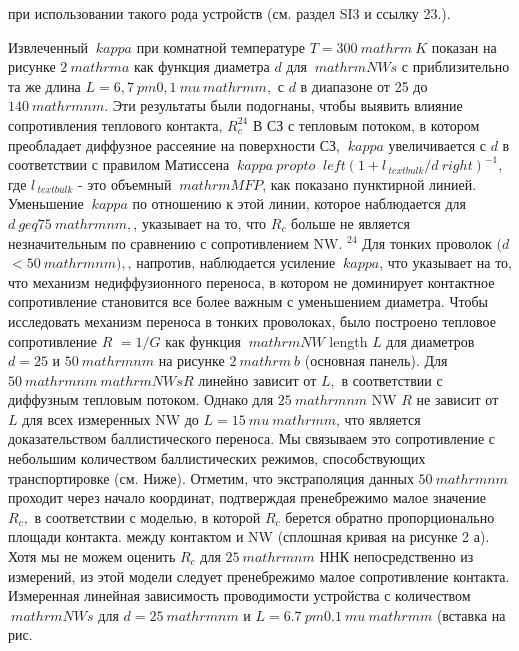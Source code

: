 \documentclass[a4paper, 12pt]{article}%
\begin{document}
при использовании такого рода устройств (см. раздел SI3 и ссылку 23.).

Извлеченный $ \ kappa $ при комнатной температуре $ T = 300 \ mathrm {~ K} $ показан на рисунке $ 2 \ mathrm {a} $ как функция диаметра $ d $ для $ \ mathrm {NWs} $ с приблизительно та же длина $ L = 6,7 \ pm 0,1 \ mu \ mathrm {m}, $ с $ d $ в диапазоне от 25 до $ 140 \ mathrm {nm}. $ Эти результаты были подогнаны, чтобы выявить влияние сопротивления теплового контакта, $ R_ {c} ^ {24} $ В СЗ с тепловым потоком, в котором преобладает диффузное рассеяние на поверхности СЗ, $ \ kappa $ увеличивается с $ d $ в соответствии с правилом Матиссена $ \ kappa \ propto $ $ \ left (1 + l_ { \ text {bulk}} / d \ right) ^ {- 1}, $ где $ l _ {\ text {bulk}} $ - это объемный $ \ mathrm {MFP} $, как показано пунктирной линией. Уменьшение $ \ kappa $ по отношению к этой линии, которое наблюдается для $ d \ geq 75 \ mathrm {nm}, $, указывает на то, что $ R_ {c} $ больше не является незначительным по сравнению с сопротивлением NW. $ {} ^ {24} $ Для тонких проволок $ (d $ $ <50 \ mathrm {nm}), $, напротив, наблюдается усиление $ \ kappa $, что указывает на то, что механизм недиффузионного переноса, в котором не доминирует контактное сопротивление становится все более важным с уменьшением диаметра. Чтобы исследовать механизм переноса в тонких проволоках, было построено тепловое сопротивление $ R $ $ = 1 / G $ как функция $ \ mathrm {NW} $ length $ L $ для диаметров $ d = 25 $ и $ 50 \ mathrm {nm} $ на рисунке $ 2 \ mathrm {~ b} $ (основная панель). Для $ 50 \ mathrm {nm} \ mathrm {NWs} R $ линейно зависит от $ L, $ в соответствии с диффузным тепловым потоком. Однако для $ 25 \ mathrm {nm} $ NW $ R $ не зависит от $ L $ для всех измеренных NW до $ L = 15 \ mu \ mathrm {m} $, что является доказательством баллистического переноса. Мы связываем это сопротивление с небольшим количеством баллистических режимов, способствующих транспортировке (см. Ниже). Отметим, что экстраполяция данных $ 50 \ mathrm {nm} $ проходит через начало координат, подтверждая пренебрежимо малое значение $ R_ {c}, $ в соответствии с моделью, в которой $ R_ {c} $ берется обратно пропорционально площади контакта. между контактом и NW (сплошная кривая на рисунке 2 а). Хотя мы не можем оценить $ R_ {c} $ для $ 25 \ mathrm {nm} $ ННК непосредственно из измерений, из этой модели следует пренебрежимо малое сопротивление контакта. Измеренная линейная зависимость проводимости устройства с количеством $ \ mathrm {NWs} $ для $ d = 25 \ mathrm {nm} $ и $ L = 6.7 \ pm 0.1 \ mu \ mathrm {m} $ (вставка на рис.
\end{document}
